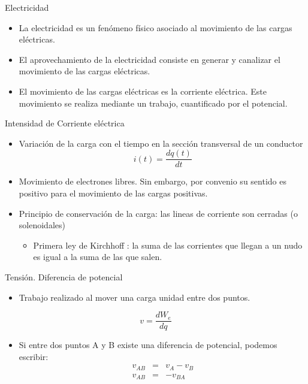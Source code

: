 \documentclass[xcolor={usenames,svgnames,dvipsnames}]{beamer}
\begin{document}
\begin{frame}[label={sec:org76ce2c0}]{Electricidad}
\begin{itemize}
\item La electricidad es un fenómeno físico asociado al \alert{movimiento de las
cargas eléctricas}.

\item El aprovechamiento de la electricidad consiste en generar y canalizar
el movimiento de las cargas eléctricas.

\item El movimiento de las cargas eléctricas es la \alert{corriente eléctrica}.
Este movimiento se realiza mediante un trabajo, cuantificado por el
\alert{potencial}.
\end{itemize}
\end{frame}

\begin{frame}[label={sec:orge79a529}]{Intensidad de Corriente eléctrica}
\begin{itemize}
\item \alert{Variación de la carga con el tiempo en la sección transversal de un
conductor} $$i(t)=\frac{dq(t)}{dt}$$

\item Movimiento de electrones libres. Sin embargo, por convenio su sentido
es positivo para el movimiento de las cargas positivas.

\item \alert{Principio de conservación de la carga}: las lineas de corriente son
cerradas (o solenoidales)

\begin{itemize}
\item Primera ley de Kirchhoff : la suma de las corrientes que llegan a
un nudo es igual a la suma de las que salen.
\end{itemize}
\end{itemize}
\end{frame}

\begin{frame}[label={sec:orgedfdbd0}]{Tensión. Diferencia de potencial}
\begin{itemize}
\item \alert{Trabajo realizado al mover una carga unidad entre dos puntos}.
\end{itemize}

$$v=\frac{dW_{e}}{dq}$$

\begin{itemize}
\item Si entre dos puntos A y B existe una diferencia de potencial, podemos
escribir: $$\begin{aligned}
         v_{AB} & = & v_{A}-v_{B}\\
         v_{AB} & = & -v_{BA}
       \end{aligned}$$
\end{itemize}
\end{frame}
\end{document}
